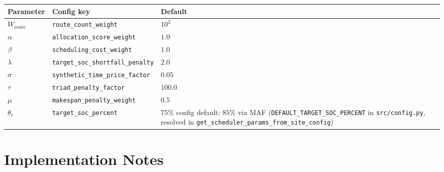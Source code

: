 \documentclass[11pt,a4paper]{article}
\newcommand{\1}{\mathbf{1}}
\begin{document}
\begin{center}
\begin{tabular}{@{}lll@{}}
\toprule
Parameter & Config key & Default \\
\midrule
$W_{\mathrm{route}}$ & \texttt{route\_count\_weight} & $10^2$ \\
$\alpha$ & \texttt{allocation\_score\_weight} & $1.0$ \\
$\beta$ & \texttt{scheduling\_cost\_weight} & $1.0$ \\
$\lambda$ & \texttt{target\_soc\_shortfall\_penalty} & $2.0$ \\
$\sigma$ & \texttt{synthetic\_time\_price\_factor} & $0.05$ \\
$\tau$ & \texttt{triad\_penalty\_factor} & $100.0$ \\
$\mu$ & \texttt{makespan\_penalty\_weight} & $0.5$ \\
$\theta_v$ & \texttt{target\_soc\_percent} & $75\%$ config default; $85\%$ via MAF (\texttt{DEFAULT\_TARGET\_SOC\_PERCENT} in \texttt{src/config.py}, resolved in \texttt{get\_scheduler\_params\_from\_site\_config}) \\
\bottomrule
\end{tabular}
\end{center}

\section{Implementation Notes}
\end{document}
